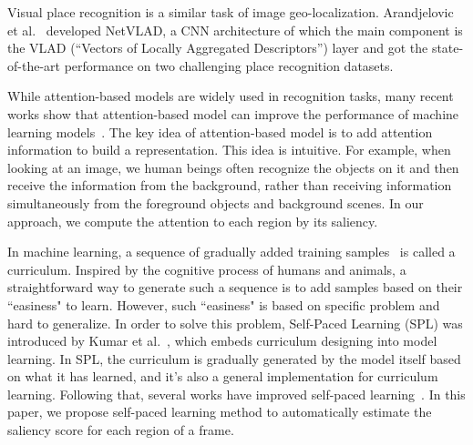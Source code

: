 Visual place recognition is a similar task of image geo-localization. 
Arandjelovic et al.~\cite{Arandjelovic16} developed NetVLAD, a CNN architecture of which the main component is the VLAD (``Vectors of Locally Aggregated Descriptors'') layer and got the state-of-the-art performance on two challenging place recognition datasets. 

While attention-based models are widely used in recognition tasks, many recent works show that attention-based model can improve the performance of machine learning models~\cite{mnih2014recurrent, zheng2015neural}. 
The key idea of attention-based model is to add attention information to build a representation. 
This idea is intuitive. 
For example, when looking at an image, we human beings often recognize the objects on it and then receive the information from the background, rather than receiving information simultaneously from the foreground objects and background scenes. 
In our approach, we compute the attention to each region by its saliency. 

In machine learning, a sequence of gradually  added training samples~\cite{bengio2009curriculum} is called a curriculum. 
Inspired by the cognitive process of humans and animals, a straightforward way to generate such a sequence is to add samples based on their ``easiness" to learn. 
However, such ``easiness" is based on specific problem and hard to generalize. 
In order to solve this problem, Self-Paced Learning (SPL) was introduced by Kumar et al.~\cite{kumar2010self}, which embeds curriculum designing into model learning. 
In SPL, the curriculum is gradually generated by the model itself based on what it has learned, and it's also a general implementation for curriculum learning. 
Following that, several works have improved self-paced learning~\cite{jiang2014easy, tang2012shifting, jiang2014self, jiang2015self}. 
In this paper, we propose self-paced learning method to automatically estimate the saliency score for each region of a frame.

